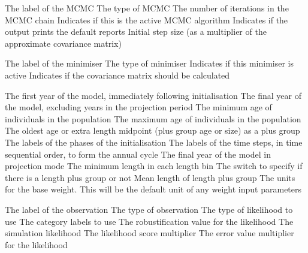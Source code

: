 \par\par

\par\par
{} {The label of the MCMC}
 {The type of MCMC}
 {The number of iterations in the MCMC chain}
 {Indicates if this is the active MCMC algorithm}
 {Indicates if the output prints the default reports}
 {Initial step size (as a multiplier of the approximate covariance matrix)}

\par\par
{} {The label of the minimiser}
 {The type of minimiser}
 {Indicates if this minimiser is active}
 {Indicates if the covariance matrix should be calculated}

\par\par
{} {The first year of the model, immediately following initialisation}
 {The final year of the model, excluding years in the projection period}
 {The minimum age of individuals in the population}
 {The maximum age of individuals in the population}
 {The oldest age or extra length midpoint (plus group age or size) as a plus group}
 {The labels of the phases of the initialisation}
 {The labels of the time steps, in time sequential order, to form the annual cycle}
 {The final year of the model in projection mode}
 {The minimum length in each length bin}
 {The switch to specify if there is a length plus group or not}
 {Mean length of length plus group}
 {The units for the base weight. This will be the default unit of any weight input parameters}

\par\par
{} {The label of the observation}
 {The type of observation}
 {The type of likelihood to use}
 {The category labels to use}
 {The robustification value for the likelihood}
 {The simulation likelihood}
 {The likelihood score multiplier}
 {The error value multiplier for the likelihood}

